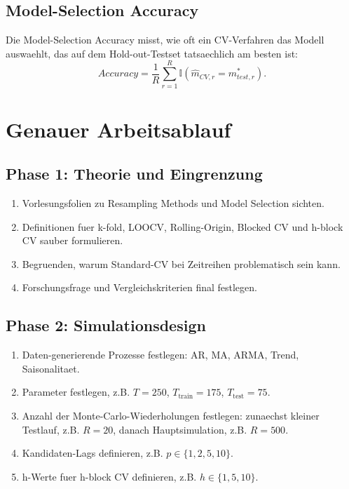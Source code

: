 \documentclass[11pt,a4paper]{article}
\begin{document}
\subsection{Model-Selection Accuracy}
Die Model-Selection Accuracy misst, wie oft ein CV-Verfahren das Modell
auswaehlt, das auf dem Hold-out-Testset tatsaechlich am besten ist:
\[
  Accuracy =
  \frac{1}{R}
  \sum_{r=1}^{R}
  \mathbb{I}
  \left(
  \hat{m}_{CV,r} = m^{*}_{test,r}
  \right).
\]

\section{Genauer Arbeitsablauf}

\subsection{Phase 1: Theorie und Eingrenzung}

\begin{enumerate}
  \item Vorlesungsfolien zu Resampling Methods und Model Selection sichten.
  \item Definitionen fuer k-fold, LOOCV, Rolling-Origin, Blocked CV und h-block CV sauber formulieren.
  \item Begruenden, warum Standard-CV bei Zeitreihen problematisch sein kann.
  \item Forschungsfrage und Vergleichskriterien final festlegen.
\end{enumerate}

\subsection{Phase 2: Simulationsdesign}

\begin{enumerate}
  \item Daten-generierende Prozesse festlegen:
  AR, MA, ARMA, Trend, Saisonalitaet.
  \item Parameter festlegen, z.B. $T = 250$,
  $T_{\text{train}} = 175$, $T_{\text{test}} = 75$.
  \item Anzahl der Monte-Carlo-Wiederholungen festlegen:
  zunaechst kleiner Testlauf, z.B. $R = 20$,
  danach Hauptsimulation, z.B. $R = 500$.
  \item Kandidaten-Lags definieren, z.B. $p \in \{1,2,5,10\}$.
  \item h-Werte fuer h-block CV definieren, z.B. $h \in \{1,5,10\}$.
\end{enumerate}
\end{document}

